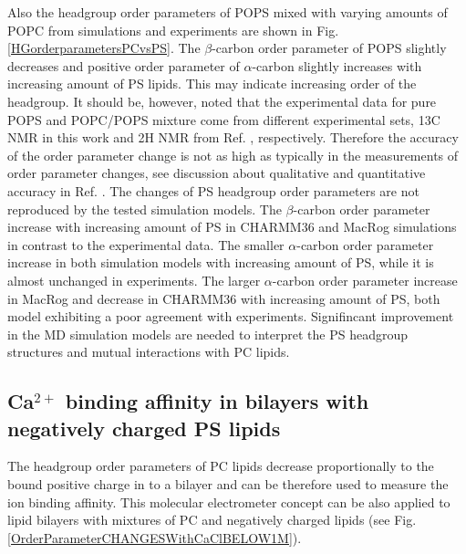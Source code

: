 \documentclass[aps,prl,superscriptaddress,twocolumn]{revtex4}
\begin{document}
Also the headgroup order parameters of POPS mixed with varying amounts of POPC
from simulations and experiments \cite{borle85,roux90} are shown in Fig. \ref{HGorderparametersPCvsPS}.
The $\beta$-carbon order parameter of POPS slightly decreases and positive 
order parameter of $\alpha$-carbon slightly increases with increasing
amount of PS lipids. This may indicate increasing order of the headgroup.
It should be, however, noted that the experimental data for pure POPS and
POPC/POPS mixture come from different experimental sets, 13C NMR in this work
and 2H NMR from Ref. , respectively. Therefore the accuracy
of the order parameter change is not as high as typically in the measurements
of order parameter changes, see discussion about qualitative and quantitative 
accuracy in Ref. . The changes of PS headgroup order parameters
are not reproduced by the tested simulation models. The $\beta$-carbon order parameter
increase with increasing amount of PS in CHARMM36 and MacRog simulations in contrast
to the experimental data. The smaller $\alpha$-carbon order parameter increase in both
simulation models with increasing amount of PS, while it is almost unchanged in experiments.
The larger $\alpha$-carbon order parameter increase in MacRog and decrease in CHARMM36
with increasing amount of PS, both model exhibiting a poor agreement with experiments. 
Signifincant improvement in the MD simulation models are needed to interpret the
PS headgroup structures and mutual interactions with PC lipids. 

\subsection{Ca$^{2+}$ binding affinity in bilayers with negatively charged PS lipids}

The headgroup order parameters of PC lipids
decrease proportionally to the bound positive
charge in to a bilayer \cite{seelig87,catte16} and can be
therefore used to measure the ion binding
affinity. This molecular electrometer concept can
be also applied to lipid bilayers with mixtures
of PC and negatively charged lipids \cite{borle85,macdonald87,roux90}
(see Fig. \ref{OrderParameterCHANGESWithCaClBELOW1M}).
%
%
\end{document}
